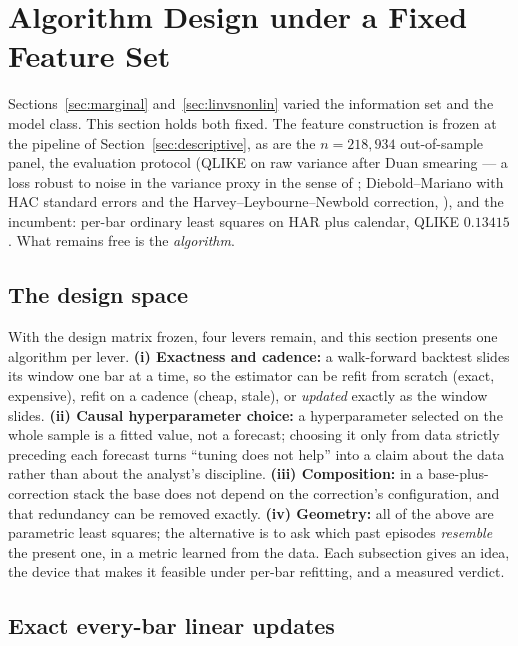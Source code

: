 \section{Algorithm Design under a Fixed Feature Set}
\label{sec:algorithms}

Sections~\ref{sec:marginal} and~\ref{sec:linvsnonlin} varied the information set
and the model class. This section holds both fixed. The feature construction is
frozen at the pipeline of Section~\ref{sec:descriptive}, as are the
$n = 218{,}934$ out-of-sample panel, the evaluation protocol (QLIKE on raw
variance after Duan smearing --- a loss robust to noise in the variance proxy in
the sense of \citealp{Patton2011,HansenLundeNason2011}; Diebold--Mariano with HAC
standard errors and the Harvey--Leybourne--Newbold correction,
\citealp{DieboldMariano1995,HarveyLeybourneNewbold1997}), and the incumbent:
per-bar ordinary least squares on HAR plus calendar, QLIKE $0.13415$. What
remains free is the \emph{algorithm}.

\subsection{The design space}
\label{sec:alg_principle}

With the design matrix frozen, four levers remain, and this section presents one
algorithm per lever. \textbf{(i) Exactness and cadence:} a walk-forward backtest
slides its window one bar at a time, so the estimator can be refit from scratch
(exact, expensive), refit on a cadence (cheap, stale), or \emph{updated} exactly as
the window slides. \textbf{(ii) Causal hyperparameter choice:} a hyperparameter
selected on the whole sample is a fitted value, not a forecast; choosing it only
from data strictly preceding each forecast turns ``tuning does not help'' into a
claim about the data rather than about the analyst's discipline.
\textbf{(iii) Composition:} in a base-plus-correction stack the base does not
depend on the correction's configuration, and that redundancy can be removed
exactly. \textbf{(iv) Geometry:} all of the above are parametric least squares; the
alternative is to ask which past episodes \emph{resemble} the present one, in a
metric learned from the data. Each subsection gives an idea, the device that makes
it feasible under per-bar refitting, and a measured verdict.

\subsection{Exact every-bar linear updates}
\label{sec:alg_exact}

